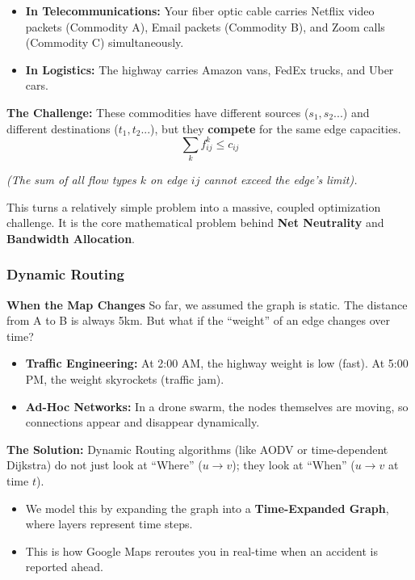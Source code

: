 \documentclass[
  letterpaper,
  DIV=11,
  numbers=noendperiod]{scrreprt}
\providecommand{\tightlist}{%
  \setlength{\itemsep}{0pt}\setlength{\parskip}{0pt}}
\begin{document}
\begin{itemize}
\tightlist
\item
  \textbf{In Telecommunications:} Your fiber optic cable carries Netflix
  video packets (Commodity A), Email packets (Commodity B), and Zoom
  calls (Commodity C) simultaneously.
\item
  \textbf{In Logistics:} The highway carries Amazon vans, FedEx trucks,
  and Uber cars.
\end{itemize}

\textbf{The Challenge:} These commodities have different sources
(\(s_1, s_2...\)) and different destinations (\(t_1, t_2...\)), but they
\textbf{compete} for the same edge capacities.
\[\sum_{k} f_{ij}^k \le c_{ij}\]

\emph{(The sum of all flow types \(k\) on edge \(ij\) cannot exceed the
edge's limit).}

This turns a relatively simple problem into a massive, coupled
optimization challenge. It is the core mathematical problem behind
\textbf{Net Neutrality} and \textbf{Bandwidth Allocation}.

\subsubsection{Dynamic Routing}\label{dynamic-routing}

\textbf{When the Map Changes} So far, we assumed the graph is static.
The distance from A to B is always 5km. But what if the ``weight'' of an
edge changes over time?

\begin{itemize}
\tightlist
\item
  \textbf{Traffic Engineering:} At 2:00 AM, the highway weight is low
  (fast). At 5:00 PM, the weight skyrockets (traffic jam).
\item
  \textbf{Ad-Hoc Networks:} In a drone swarm, the nodes themselves are
  moving, so connections appear and disappear dynamically.
\end{itemize}

\textbf{The Solution:} Dynamic Routing algorithms (like AODV or
time-dependent Dijkstra) do not just look at ``Where'' (\(u \to v\));
they look at ``When'' (\(u \to v\) at time \(t\)).

\begin{itemize}
\tightlist
\item
  We model this by expanding the graph into a \textbf{Time-Expanded
  Graph}, where layers represent time steps.
\item
  This is how Google Maps reroutes you in real-time when an accident is
  reported ahead.
\end{itemize}
\end{document}

